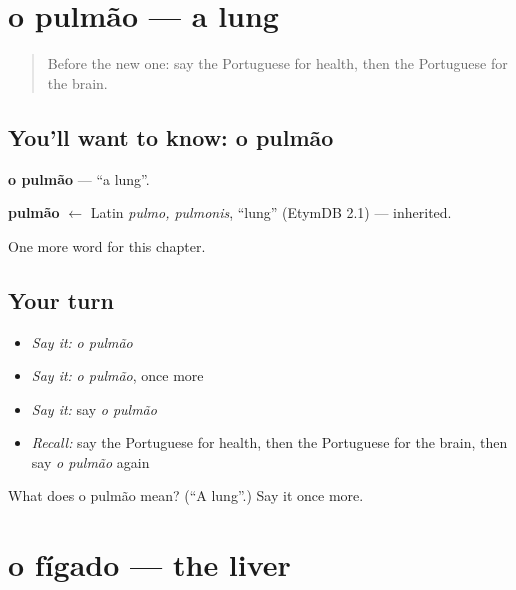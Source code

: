 \section[o pulmão]{o pulmão — a lung}

\label{lesson:PT-C148-pulmao}



\begin{quote}
Before the new one: say the Portuguese for health, then the Portuguese for the brain.
\end{quote}

\subsection*{You'll want to know: o pulmão}
\textbf{o pulmão} — \textquotedblleft{}a lung\textquotedblright{}.

\begin{cousinweb}
\textbf{pulmão} $\leftarrow$ Latin \emph{pulmo, pulmonis}, \textquotedblleft{}lung\textquotedblright{} (EtymDB 2.1) — inherited.
\end{cousinweb}

\begin{grammarlens}[title={What you've built}]
One more word for this chapter.
\end{grammarlens}

\subsection*{Your turn}
\begin{itemize}
\raggedright
  \item \emph{Say it:} \emph{o pulmão}
  \item \emph{Say it:} \emph{o pulmão}, once more
  \item \emph{Say it:} say \emph{o pulmão}
  \item \emph{Recall:} say the Portuguese for health, then the Portuguese for the brain, then say \emph{o pulmão} again
\end{itemize}

\begin{tcolorbox}[breakable,colback=teal!4,colframe=teal!35!black,title={Before you move on}]
What does o pulmão mean? (\textquotedblleft{}A lung\textquotedblright{}.) Say it once more.
\end{tcolorbox}
\section[o fígado]{o fígado — the liver}

